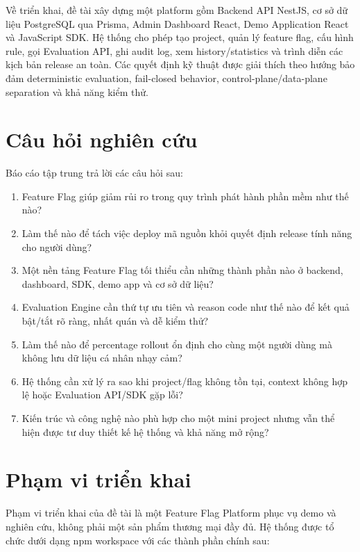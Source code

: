 Về triển khai, đề tài xây dựng một platform gồm Backend API NestJS, cơ sở dữ liệu PostgreSQL qua Prisma, Admin Dashboard React, Demo Application React và JavaScript SDK. Hệ thống cho phép tạo project, quản lý feature flag, cấu hình rule, gọi Evaluation API, ghi audit log, xem history/statistics và trình diễn các kịch bản release an toàn. Các quyết định kỹ thuật được giải thích theo hướng bảo đảm deterministic evaluation, fail-closed behavior, control-plane/data-plane separation và khả năng kiểm thử.

\section{Câu hỏi nghiên cứu}

Báo cáo tập trung trả lời các câu hỏi sau:

\begin{enumerate}
    \item Feature Flag giúp giảm rủi ro trong quy trình phát hành phần mềm như thế nào?
    \item Làm thế nào để tách việc deploy mã nguồn khỏi quyết định release tính năng cho người dùng?
    \item Một nền tảng Feature Flag tối thiểu cần những thành phần nào ở backend, dashboard, SDK, demo app và cơ sở dữ liệu?
    \item Evaluation Engine cần thứ tự ưu tiên và reason code như thế nào để kết quả bật/tắt rõ ràng, nhất quán và dễ kiểm thử?
    \item Làm thế nào để percentage rollout ổn định cho cùng một người dùng mà không lưu dữ liệu cá nhân nhạy cảm?
    \item Hệ thống cần xử lý ra sao khi project/flag không tồn tại, context không hợp lệ hoặc Evaluation API/SDK gặp lỗi?
    \item Kiến trúc và công nghệ nào phù hợp cho một mini project nhưng vẫn thể hiện được tư duy thiết kế hệ thống và khả năng mở rộng?
\end{enumerate}

\section{Phạm vi triển khai}

Phạm vi triển khai của đề tài là một Feature Flag Platform phục vụ demo và nghiên cứu, không phải một sản phẩm thương mại đầy đủ. Hệ thống được tổ chức dưới dạng npm workspace với các thành phần chính sau:

